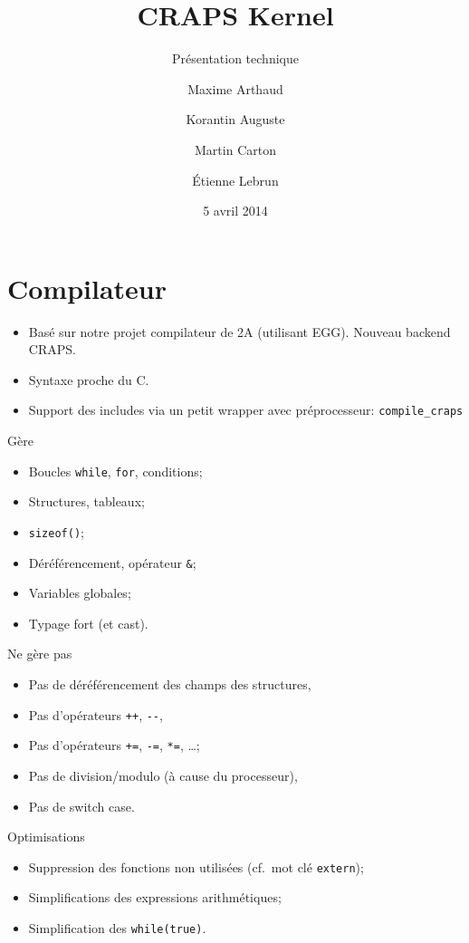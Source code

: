 \documentclass{beamer}
\title{CRAPS Kernel}
\subtitle{Présentation technique}
\author{
       Maxime Arthaud
  \and Korantin Auguste
  \and Martin Carton
  \and Étienne Lebrun
}
\date{5 avril 2014}
\begin{document}
  \begin{frame}
    \titlepage%
  \end{frame}

  \section{Compilateur}
    \begin{frame}[fragile]
      \begin{itemize}
        \item Basé sur notre projet compilateur de 2A (utilisant EGG). Nouveau
          backend CRAPS.
        \item Syntaxe proche du C.
        \item Support des includes via un petit wrapper avec préprocesseur:
          \verb+compile_craps+
      \end{itemize}
\end{frame}

    \begin{frame}[fragile]{Gère}
      \begin{itemize}
        \item Boucles \verb+while+, \verb+for+, conditions;
        \item Structures, tableaux;
        \item \verb+sizeof()+;
        \item Déréférencement, opérateur \verb+&+;
        \item Variables globales;
        \item Typage fort (et cast).
      \end{itemize}
\end{frame}

    \begin{frame}[fragile]{Ne gère pas}
      \begin{itemize}
        \item Pas de déréférencement des champs des structures,
        \item Pas d'opérateurs \verb|++|, \verb|--|,
        \item Pas d'opérateurs \verb|+=|, \verb|-=|, \verb|*=|, \dots;
        \item Pas de division/modulo (à cause du processeur),
        \item Pas de switch case.
      \end{itemize}
\end{frame}

    \begin{frame}[fragile]{Optimisations}
      \begin{itemize}
        \item Suppression des fonctions non utilisées (cf.\ mot clé
          \verb+extern+);
        \item Simplifications des expressions arithmétiques;
        \item Simplification des \verb+while(true)+.
      \end{itemize}
\end{frame}
\end{document}
